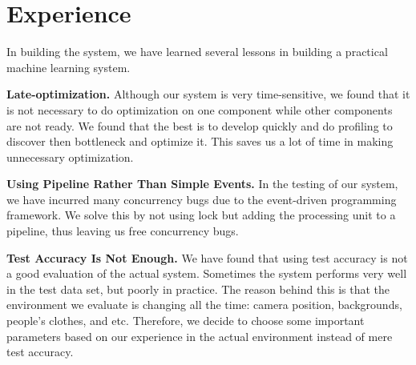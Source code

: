 \section{Experience}

In building the system, we have learned several lessons in building a practical machine learning system.

\textbf{Late-optimization.} Although our system is very time-sensitive, we found that it is not necessary to do optimization on one component while other components are not ready. We found that the best is to  develop quickly and do profiling to discover then bottleneck and optimize it. This saves us a lot of time in making unnecessary optimization.   

\textbf{Using Pipeline Rather Than Simple Events.} In the testing of our system, we have incurred many concurrency bugs due to the event-driven programming framework. We solve this by not using lock but adding the processing unit to a pipeline, thus leaving us free concurrency bugs.  

\textbf{Test Accuracy Is Not Enough.} We have found that using test accuracy is not a good evaluation of the actual system. Sometimes the system performs very well in the test data set, but poorly in practice. The reason behind this is that the environment we evaluate is changing all the time: camera position, backgrounds, people's clothes, and etc. Therefore, we decide to choose some important parameters based on our experience in the actual environment instead of mere test accuracy. 